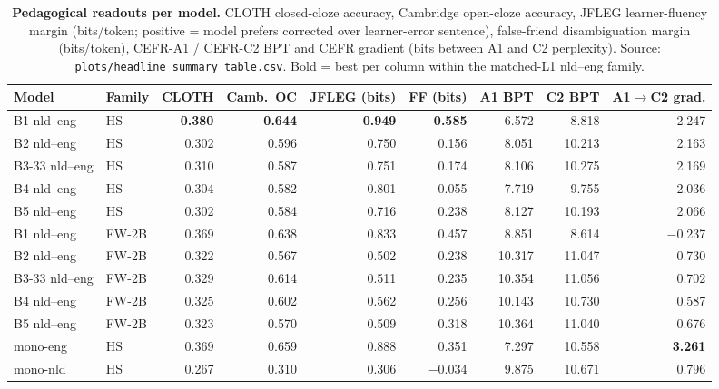 \begin{table}[!ht]
  \centering
  \scriptsize
  \setlength{\tabcolsep}{4pt}
  \caption{\textbf{Pedagogical readouts per \beetle{} model.} CLOTH closed-cloze accuracy, Cambridge open-cloze accuracy, JFLEG learner-fluency margin (bits/token; positive = model prefers corrected over learner-error sentence), false-friend disambiguation margin (bits/token), CEFR-A1 / CEFR-C2 BPT and CEFR gradient (bits between A1 and C2 perplexity). Source: \texttt{plots/headline\_summary\_table.csv}. Bold = best per column within the matched-L1 nld--eng family.}
  \label{tab:headline_pedagogical}
  \begin{tabular}{llrrrrrrr}
    \toprule
    Model & Family & CLOTH & Camb.~OC & JFLEG (bits) & FF (bits) & A1 BPT & C2 BPT & A1$\to$C2 grad. \\
    \midrule
    B1 nld--eng     & HS & \textbf{0.380} & \textbf{0.644} & \textbf{0.949} & \textbf{0.585} & 6.572 & 8.818 & 2.247 \\
    B2 nld--eng     & HS & 0.302 & 0.596 & 0.750 & 0.156 & 8.051 & 10.213 & 2.163 \\
    B3-33 nld--eng  & HS & 0.310 & 0.587 & 0.751 & 0.174 & 8.106 & 10.275 & 2.169 \\
    B4 nld--eng     & HS & 0.304 & 0.582 & 0.801 & $-$0.055 & 7.719 & 9.755 & 2.036 \\
    B5 nld--eng     & HS & 0.302 & 0.584 & 0.716 & 0.238 & 8.127 & 10.193 & 2.066 \\
    \midrule
    B1 nld--eng     & FW-2B & 0.369 & 0.638 & 0.833 & 0.457 & 8.851 & 8.614 & $-$0.237 \\
    B2 nld--eng     & FW-2B & 0.322 & 0.567 & 0.502 & 0.238 & 10.317 & 11.047 & 0.730 \\
    B3-33 nld--eng  & FW-2B & 0.329 & 0.614 & 0.511 & 0.235 & 10.354 & 11.056 & 0.702 \\
    B4 nld--eng     & FW-2B & 0.325 & 0.602 & 0.562 & 0.256 & 10.143 & 10.730 & 0.587 \\
    B5 nld--eng     & FW-2B & 0.323 & 0.570 & 0.509 & 0.318 & 10.364 & 11.040 & 0.676 \\
    \midrule
    mono-eng        & HS & 0.369 & 0.659 & 0.888 & 0.351 & 7.297 & 10.558 & \textbf{3.261} \\
    mono-nld        & HS & 0.267 & 0.310 & 0.306 & $-$0.034 & 9.875 & 10.671 & 0.796 \\
    \bottomrule
  \end{tabular}
\end{table}

